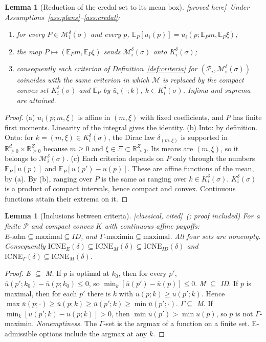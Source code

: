 \documentclass[11pt]{article}
\newtheorem{lemma}[theorem]{Lemma}
\theoremstyle{definition}
\theoremstyle{remark}
\newcommand{\R}{\mathbb{R}}
\newcommand{\E}{\mathbb{E}}
\newcommand{\cP}{\mathcal{P}}
\newcommand{\cM}{\mathcal{M}}
\newcommand{\ub}{\bar u}
\newcommand{\ICNE}{\mathrm{ICNE}}
\newcommand{\PROVED}{\textsf{[proved here]}}
\newcommand{\CLASSICAL}{\textsf{[classical, cited]}}
\begin{document}
\begin{lemma}[Reduction of the credal set to its mean box]\label{lem:reduction} \PROVED\
Under Assumptions~\ref{ass:plans}--\ref{ass:credal}:
\begin{enumerate}[label=(\alph*)]
\item for every $P\in\cM_i^\delta(\sigma)$ and every $p$, $\E_P[u_i(p)]=\ub_i(p;\E_Pm,\E_P\xi)$;
\item the map $P\mapsto(\E_Pm,\E_P\xi)$ sends $\cM_i^\delta(\sigma)$ onto $K_i^\delta(\sigma)$;
\item consequently each criterion of Definition~\ref{def:criteria} for $(\cP_i,\cM_i^\delta(\sigma))$ coincides with the same criterion in which $\cM$ is replaced by the compact convex set $K_i^\delta(\sigma)$ and $\E_P$ by $\ub_i(\cdot;k)$, $k\in K_i^\delta(\sigma)$. Infima and suprema are attained.
\end{enumerate}
\end{lemma}
\begin{proof}
(a) $u_i(p;m,\xi)$ is affine in $(m,\xi)$ with fixed coefficients, and $P$ has finite first moments. Linearity of the integral gives the identity.
(b) Into: by definition. Onto: for $k=(m,\xi)\in K_i^\delta(\sigma)$, the Dirac law $\delta_{(m,\xi)}$ is supported in $\R^d_{\ge0}\times\R^Z_{\ge0}$ because $m\ge0$ and $\xi\in\Xi\subset\R^Z_{\ge0}$. Its means are $(m,\xi)$, so it belongs to $\cM_i^\delta(\sigma)$.
(c) Each criterion depends on $P$ only through the numbers $\E_P[u(p)]$ and $\E_P[u(p')-u(p)]$. These are affine functions of the mean, by (a). By (b), ranging over $P$ is the same as ranging over $k\in K_i^\delta(\sigma)$. $K_i^\delta(\sigma)$ is a product of compact intervals, hence compact and convex. Continuous functions attain their extrema on it.
\end{proof}

\begin{lemma}[Inclusions between criteria]\label{lem:nesting} \CLASSICAL\ (\cite{Troffaes07}; proof included)
For a finite $\cP$ and compact convex $K$ with continuous affine payoffs:
$E\text{-adm}\subseteq\text{maximal}\subseteq ID$, and $\Gamma\text{-maximin}\subseteq\text{maximal}$. All four sets are nonempty. Consequently $\ICNE_E(\delta)\subseteq\ICNE_M(\delta)\subseteq\ICNE_{ID}(\delta)$ and $\ICNE_\Gamma(\delta)\subseteq\ICNE_M(\delta)$.
\end{lemma}
\begin{proof}
\emph{E $\subseteq$ M.} If $p$ is optimal at $k_0$, then for every $p'$, $\ub(p';k_0)-\ub(p;k_0)\le0$, so $\min_k[\ub(p')-\ub(p)]\le0$.
\emph{M $\subseteq$ ID.} If $p$ is maximal, then for each $p'$ there is $k$ with $\ub(p;k)\ge\ub(p';k)$. Hence $\max\ub(p;\cdot)\ge\ub(p;k)\ge\ub(p';k)\ge\min\ub(p';\cdot)$.
\emph{$\Gamma\subseteq$ M.} If $\min_k[\ub(p';k)-\ub(p;k)]>0$, then $\min\ub(p')>\min\ub(p)$, so $p$ is not $\Gamma$-maximin.
\emph{Nonemptiness.} The $\Gamma$-set is the argmax of a function on a finite set. E-admissible options include the argmax at any $k$.
\end{proof}
\end{document}
